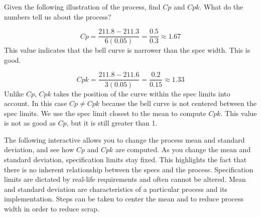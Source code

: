 \documentclass{ximera}
\begin{document}
\begin{example}\label{ex:CpCpk}
    Given the following illustration of the process, find $Cp$ and $Cpk$.  What do the numbers tell us about the process?
    \begin{center}
\end{center}

\begin{explanation}
    $$Cp=\frac{211.8-211.3}{6(0.05)}=\frac{0.5}{0.3}\approx 1.67$$
This value indicates that the bell curve is narrower than the spec width.  This is good.

$$Cpk=\frac{211.8-211.6}{3(0.05)}=\frac{0.2}{0.15}\approx 1.33$$
Unlike $Cp$, $Cpk$ takes the position of the curve within the spec limits into account.  In this case $Cp\neq Cpk$ because the bell curve is not centered between the spec limits.  We use the spec limit closest to the mean to compute $Cpk$.  This value is not as good as $Cp$, but it is still greater than 1.  
\end{explanation}
\end{example}

The following interactive allows you to change the process mean and standard deviation, and see how $Cp$ and $Cpk$ are computed.
As you change the mean and standard deviation, specification limits stay fixed. This highlights the fact that there is no inherent relationship between the specs and the process.  Specification limits are dictated by real-life requirements and often cannot be altered.  Mean and standard deviation are characteristics of a particular process and its implementation.  Steps can be taken to center the mean and to reduce process width in order to reduce scrap.
\end{document}
